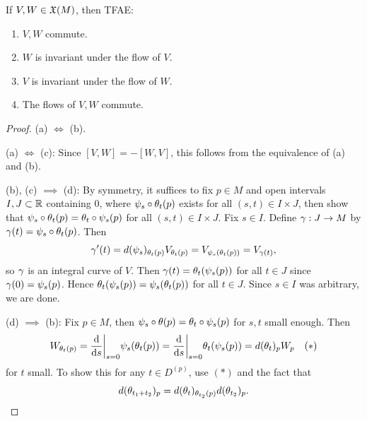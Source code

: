 \begin{theorem} %
    If $V,W \in \frak{X}(M)$, then TFAE:
    \begin{enumerate}
    \item $V,W$ commute.
    \item $W$ is invariant under the flow of $V$. 
    \item $V$ is invariant under the flow of $W$.
    \item The flows of $V,W$ commute. 
    \end{enumerate}
\end{theorem}
\begin{proof}
    (a) $\iff$ (b). 

    (a) $\iff$ (c): Since $[V,W] = -[W,V]$, this follows from the equivalence of (a) and (b). 

    (b), (c) $\implies$ (d): By symmetry, it suffices to fix $p \in M$ and open intervals $I,J \subset \mathbb{R}$ containing $0$, where $\psi_s \circ \theta_t(p)$ exists for all $(s,t) \in I \times J$, then show that $\psi_s \circ \theta_t(p) = \theta_t \circ \psi_s(p)$ for all $(s,t) \in I \times J$. 
    Fix $s \in I$. Define $\gamma:J \to M$ by $\gamma(t) = \psi_s \circ \theta_t(p)$. Then $$\gamma'(t) = d(\psi_s)_{\theta_t(p)} V_{\theta_t(p)} = V_{\psi_s(\theta_t(p))} = V_{\gamma(t)}, $$
    so $\gamma$ is an integral curve of $V$. Then $\gamma(t) = \theta_t(\psi_s(p))$ for all $t \in J$ since $\gamma(0) = \psi_s(p)$. Hence $\theta_t(\psi_s(p)) = \psi_s(\theta_t(p))$ for all $t \in J$. Since $s \in I$ was arbitrary, we are done.

    (d) $\implies$ (b): Fix $p \in M$, then $\psi_s \circ \theta(p) = \theta_t \circ \psi_s(p)$ for $s,t$ small enough. Then $$W_{\theta_t(p)} = \dv{}{s}\bigg|_{s=0}\psi_s(\theta_t(p)) = \dv{}{s}\bigg|_{s=0}\theta_t(\psi_s(p)) = d(\theta_t)_{p}W_p \quad (*) $$
    for $t$ small. To show this for any $t \in D^{(p)}$, use $(*)$ and the fact that 
    $$d(\theta_{t_1+t_2})_p = d(\theta_t)_{\theta_{t_2}(p)}d(\theta_{t_2})_p. $$
\end{proof}


